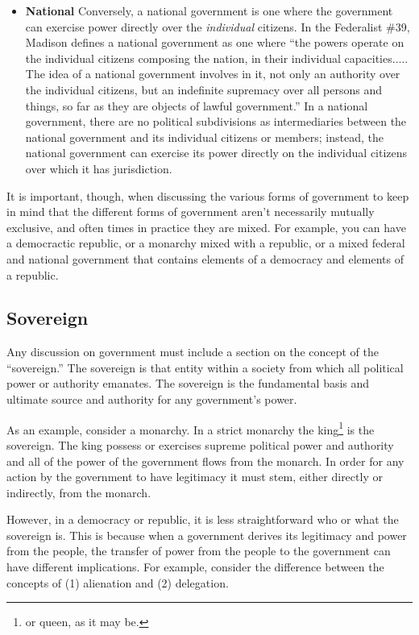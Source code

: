 \begin{itemize}
\item \textbf{National}
Conversely, a national government is one where the government can exercise power directly over the \textit{individual} citizens.  In the Federalist \#39, Madison defines a national government as one where ``the powers operate on the individual citizens composing the nation, in their individual capacities..... The idea of a national government involves in it, not only an authority over the individual citizens, but an indefinite supremacy over all persons and things, so far as they are objects of lawful government.''  In a national government, there are no political subdivisions as intermediaries between the national government and its individual citizens or members; instead, the national government can exercise its power directly on the individual citizens over which it has jurisdiction.

\end{itemize}

It is important, though, when discussing the various forms of government to keep in mind that the different forms of government aren't necessarily mutually exclusive, and often times in practice they are mixed.  For example, you can have a democractic republic, or a monarchy mixed with a republic, or a mixed federal and national government that contains elements of a democracy and elements of a republic.

\subsection{Sovereign}

Any discussion on government must include a section on the concept of the ``sovereign.''  
The sovereign is that entity within a society from which all political power or authority emanates.  The sovereign is the fundamental basis and ultimate source and authority for any government's power.

As an example, consider a monarchy.  In a strict monarchy the king\footnote{or queen, as it may be.} is the sovereign.  The king possess or exercises supreme political power and authority and all of the power of the government flows from the monarch.  In order for any action by the government to have legitimacy it must stem, either directly or indirectly, from the monarch.  

However, in a democracy or republic, it is less straightforward who or what the sovereign is.  This is because when a government derives its legitimacy and power from the people, the transfer of power from the people to the government can have different implications.  For example, consider the difference between the concepts of (1) alienation and (2) delegation.

